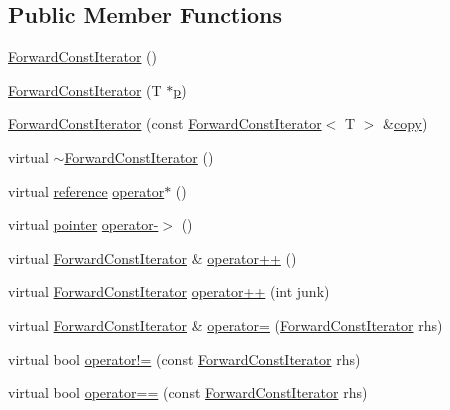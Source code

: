 \subsection*{Public Member Functions}
\begin{DoxyCompactItemize}
\item 
\hyperlink{classprism_1_1_forward_const_iterator_aee0b75e34fd106fc31bb63618089cd68}{Forward\+Const\+Iterator} ()
\item 
\hyperlink{classprism_1_1_forward_const_iterator_a788a7ad191bae8f5a8c5aadf5c85e6de}{Forward\+Const\+Iterator} (T $\ast$\hyperlink{classprism_1_1_forward_const_iterator_ad4e0c824b923c399c6ee381a03e66df2}{p})
\item 
\hyperlink{classprism_1_1_forward_const_iterator_a9db8d1feaaa08c62dc2615e708198843}{Forward\+Const\+Iterator} (const \hyperlink{classprism_1_1_forward_const_iterator}{Forward\+Const\+Iterator}$<$ T $>$ \&\hyperlink{namespaceprism_ae776f4cd825f79e7af1cf6ee1d90a209}{copy})
\item 
virtual \hyperlink{classprism_1_1_forward_const_iterator_a67b8cd8e6c8929b8ef88fddac62f2058}{$\sim$\+Forward\+Const\+Iterator} ()
\item 
virtual \hyperlink{classprism_1_1_forward_const_iterator_a839eeb121503b031260ad21ef844dd9a}{reference} \hyperlink{classprism_1_1_forward_const_iterator_aa2c258793cfc86a62dac31854deadab2}{operator$\ast$} ()
\item 
virtual \hyperlink{classprism_1_1_forward_const_iterator_a6e4e245d3ab99d6e9b237abe2c0c06d8}{pointer} \hyperlink{classprism_1_1_forward_const_iterator_a573e5c6144470a8030e82116c1674983}{operator-\/$>$} ()
\item 
virtual \hyperlink{classprism_1_1_forward_const_iterator}{Forward\+Const\+Iterator} \& \hyperlink{classprism_1_1_forward_const_iterator_a8a73dd55dac644cdd0f102d35c74c434}{operator++} ()
\item 
virtual \hyperlink{classprism_1_1_forward_const_iterator}{Forward\+Const\+Iterator} \hyperlink{classprism_1_1_forward_const_iterator_aa00254618332a18101e60a84ec9d44d7}{operator++} (int junk)
\item 
virtual \hyperlink{classprism_1_1_forward_const_iterator}{Forward\+Const\+Iterator} \& \hyperlink{classprism_1_1_forward_const_iterator_a72c3696ffe630ed434d188dcbaea28de}{operator=} (\hyperlink{classprism_1_1_forward_const_iterator}{Forward\+Const\+Iterator} rhs)
\item 
virtual bool \hyperlink{classprism_1_1_forward_const_iterator_aa370c912df9e042cbe4def9b48cf0f1d}{operator!=} (const \hyperlink{classprism_1_1_forward_const_iterator}{Forward\+Const\+Iterator} rhs)
\item 
virtual bool \hyperlink{classprism_1_1_forward_const_iterator_ab3bfd9e80ed15677622622ceb173bb20}{operator==} (const \hyperlink{classprism_1_1_forward_const_iterator}{Forward\+Const\+Iterator} rhs)
\end{DoxyCompactItemize}
